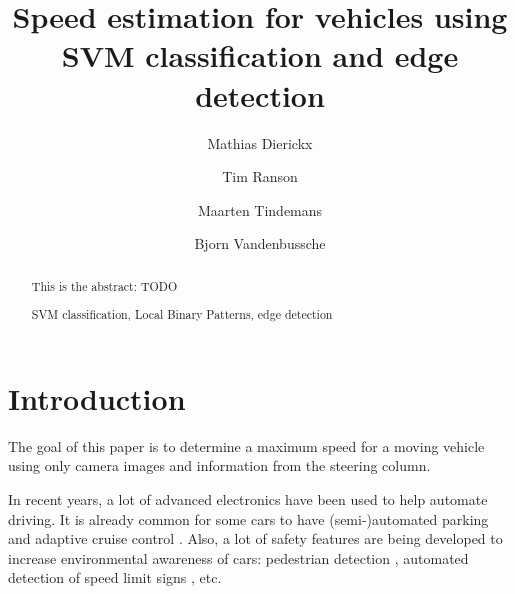 \documentclass[runningheads,a4paper]{llncs}
\newcommand{\keywords}[1]{\par\addvspace\baselineskip
\noindent\keywordname\enspace\ignorespaces#1}
\begin{document}
\mainmatter  %

\title{Speed estimation for vehicles using \\SVM classification and edge detection}


%
%
\author{Mathias Dierickx\and Tim Ranson\and Maarten Tindemans\and Bjorn Vandenbussche}
%


\maketitle

\begin{abstract}
This is the abstract: TODO
\keywords{SVM classification, Local Binary Patterns, edge detection}
\end{abstract}


\section{Introduction}
The goal of this paper is to determine a maximum speed for a moving vehicle using only camera images and information from the steering column. 

In recent years, a lot of advanced electronics have been used to help automate driving. It is already common for some cars to have (semi-)automated parking \cite{Pohl2006} and adaptive cruise control \cite{Jurgen}. Also, a lot of safety features are being developed to increase environmental awareness of cars: pedestrian detection \cite{Gavrila2000}, automated detection of speed limit signs \cite{Torresen2004}, etc. 
\end{document}
